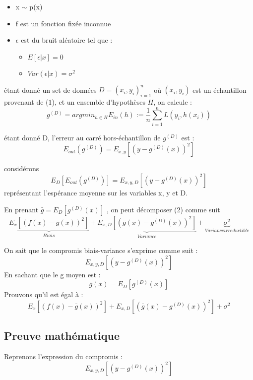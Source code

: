 \documentclass[a4paper]{article}
\begin{document}
\begin{itemize}
	\item x $\sim$ p(x)
	\item f est un fonction fixée inconnue
	\item $\epsilon$ est du bruit aléatoire tel que :
	\begin{itemize}
		\item $E[\epsilon|x] = 0$
		\item $Var(\epsilon|x) = \sigma^2$
	\end{itemize}
\end{itemize}


étant donné un set de données $D = {(x_i, y_i)}^n_{i=1}$ où $(x_i, y_i)$ est un échantillon provenant de (1), et un ensemble d'hypothèses $H$, on calcule :
\[ g^{(D)} = argmin_{h\in H}  E_{in}(h) := \frac{1}{n} \sum_{i=1}^{n} L(y_i,h(x_i)) \]

étant donné D, l'erreur au carré hors-échantillon de $g^{(D)}$ est :
\[ E_{out}(g^{(D)}) = E_{x,y}[(y - g^{(D)}(x))^2] \]

considérons 
\begin{equation}
E_D[E_{out}(g^{(D)})] = E_{x,y,D}[(y - g^{(D)}(x))^2]
\end{equation}
représentant l'espérance moyenne sur les variables x, y et D.

En prenant $ \bar{g} = E_D[g^{(D)}(x)]$ , on peut décomposer (2) comme suit 
\[ \underbrace{E_x[(f(x) - \bar{g}(x))^2]}_{Biais} + \underbrace{E_{x,D}[(\bar{g}(x) - g^{(D)}(x))^2]}_{Variance} + \underbrace{\sigma^2}_{Variance irreductible} \]

\newpage

On sait que le compromis biais-variance s'exprime comme suit : 
\[ E_{x,y,D}[(y-g^{(D)}(x))^2] \]
En sachant que le g moyen est :
\begin{equation}
\label{g_moyen}
\bar{g}(x) = E_D [g^{(D)}(x)]
\end{equation}
Prouvons qu'il est égal à :
\[ E_x[(f(x) - \bar{g}(x))^2] + E_{x,D}[(\bar{g}(x) - g^{(D)}(x))^2] + \sigma^2 \]

\subsection{Preuve mathématique}

Reprenons l'expression du compromis :
\begin{equation}
\label{Bias_Variance_formula}
E_{x,y,D}[(y-g^{(D)}(x))^2]
\end{equation}
\end{document}
